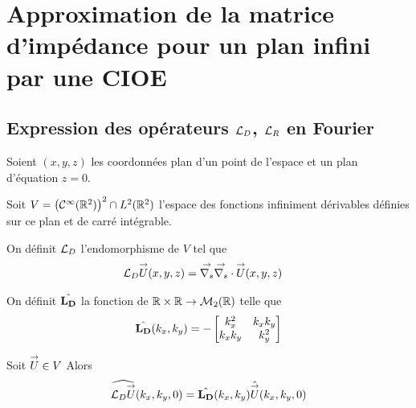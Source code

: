 \section{Approximation de la matrice d'impédance pour un plan infini par une CIOE}

  \subsection[Expression des opérateurs LD, LR en Fourier]{Expression des opérateurs \({\mathcal{L}_D}\), \({\mathcal{L}_R}\) en Fourier}
    \label{sec:plan:hoibc:LD-LR}
    Soient \((x,y,z)\) les coordonnées plan d'un point de l'espace et un plan d'équation \(z=0\).

    Soit \(V = \left(\mathcal{C}^\infty(\mathbb R^2)\right)^2 \cap L^2(\mathbb R^2)\) l'espace des fonctions infiniment dérivables définies sur ce plan et de carré intégrable.

    \begin{defn}
      \label{eq:plan:fourier:LD}
      On définit \({\mathcal{L}_D}\) l'endomorphisme de \(V\) tel que
      \begin{align*}
        {\mathcal{L}_D} {\overset{\rightarrow}{U}}(x,y,z) & = {\overset{\rightarrow}{\nabla_s}}{} {\overset{\rightarrow}{\nabla_s}} \cdot{} {\overset{\rightarrow}{U}}(x,y,z)
      \end{align*}

      On définit \(\hat{\mathbf{L_D}}\) la fonction de \(\mathbb R\times\mathbb R \rightarrow \mathcal{M}_2(\mathbb R)\) telle que
      \begin{equation*}
        \hat{\mathbf{L_D}}(k_x,k_y) = -
        \begin{bmatrix}
          k_x^2 & k_xk_y
          \\
          k_xk_y & k_y^2
        \end{bmatrix}
      \end{equation*}
    \end{defn}

    \begin{prop}
      Soit \({\overset{\rightarrow}{U}} \in V\)
      Alors
      \begin{equation*}
        \widehat{{\mathcal{L}_D} {\overset{\rightarrow}{U}}} (k_x,k_y,0) = \hat{\mathbf{L_D}}(k_x,k_y) \hat{{\overset{\rightarrow}{U}}}(k_x,k_y,0)
      \end{equation*}
    \end{prop}

